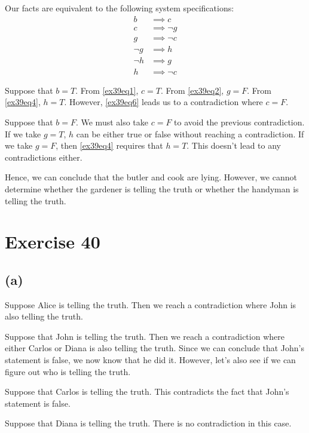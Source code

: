 \documentclass{article}
\begin{document}
Our facts are equivalent to the following system specifications:
\begin{align}
	b      & \implies c \label{ex39eq1}      \\
	c      & \implies \neg g \label{ex39eq2} \\
	g      & \implies \neg c \label{ex39eq3} \\
	\neg g & \implies h \label{ex39eq4}      \\
	\neg h & \implies g \label{ex39eq5}      \\
	h      & \implies \neg c \label{ex39eq6}
\end{align}

Suppose that $b = T$. From \eqref{ex39eq1}, $c = T$.  From \eqref{ex39eq2}, $g = F$.  From \eqref{ex39eq4}, $h = T$. However, \eqref{ex39eq6} leads us to a contradiction where $c = F$.

Suppose that $b = F$.  We must also take $c = F$ to avoid the previous contradiction.  If we take $g = T$, $h$ can be either true or false without reaching a contradiction.  If we take $g = F$, then \eqref{ex39eq4} requires that $h = T$.  This doesn't lead to any contradictions either.

Hence, we can conclude that the butler and cook are lying. However, we cannot determine whether the gardener is telling the truth or whether the handyman is telling the truth.

\pagebreak

\section{Exercise 40}

\subsection{(a)}

Suppose Alice is telling the truth. Then we reach a contradiction where John is also telling the truth.

Suppose that John is telling the truth. Then we reach a contradiction where either Carlos or Diana is also telling the truth. Since we can conclude that John's statement is false, we now know that he did it. However, let's also see if we can figure out who is telling the truth.

Suppose that Carlos is telling the truth. This contradicts the fact that John's statement is false.

Suppose that Diana is telling the truth. There is no contradiction in this case.
\end{document}
